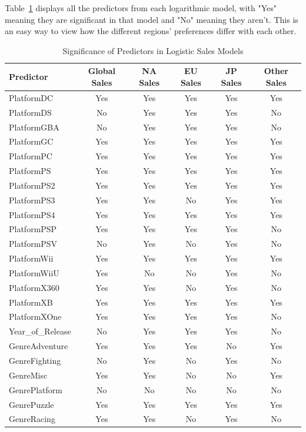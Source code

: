 \documentclass[12pt]{article}
\begin{document}
Table~\ref{tab:significance} displays all the predictors from each logarithmic model, with "Yes" meaning they are significant in 
that model and "No" meaning they aren't. This is an easy way to view how the different regions' preferences differ with each other. 
\begin{table}[ht]
  \caption{Significance of Predictors in Logistic Sales Models}
  \label{tab:significance}
  \centering
  \begin{tabular}{lccccc}
    \hline
    Predictor & Global Sales & NA Sales & EU Sales & JP Sales & Other Sales \\
    \hline
    PlatformDC & Yes & Yes & Yes & Yes & Yes \\
    PlatformDS & No & Yes & Yes & Yes & No \\
    PlatformGBA & No & Yes & Yes & Yes & No \\
    PlatformGC & Yes & Yes & Yes & Yes & Yes \\
    PlatformPC & Yes & Yes & Yes & Yes & Yes \\
    PlatformPS & Yes & Yes & Yes & Yes & Yes \\
    PlatformPS2 & Yes & Yes & Yes & Yes & Yes \\
    PlatformPS3 & Yes & Yes & No & Yes & Yes \\
    PlatformPS4 & Yes & Yes & Yes & Yes & Yes \\
    PlatformPSP & Yes & Yes & Yes & Yes & No \\
    PlatformPSV & No & Yes & No & Yes & No \\
    PlatformWii & Yes & Yes & Yes & Yes & Yes \\
    PlatformWiiU & Yes & No & No & Yes & No \\
    PlatformX360 & Yes & Yes & No & Yes & No \\
    PlatformXB & Yes & Yes & Yes & Yes & Yes \\
    PlatformXOne & Yes & Yes & Yes & Yes & No \\
    Year\_of\_Release & No & Yes & Yes & Yes & No \\
    GenreAdventure & Yes & Yes & Yes & No & Yes \\
    GenreFighting & No & Yes & No & Yes & No \\
    GenreMisc & Yes & Yes & No & No & Yes \\
    GenrePlatform & No & No & No & No & No \\
    GenrePuzzle & Yes & Yes & Yes & Yes & Yes \\
    GenreRacing & Yes & Yes & No & Yes & No \\

\end{tabular}
\end{table}
\end{document}
